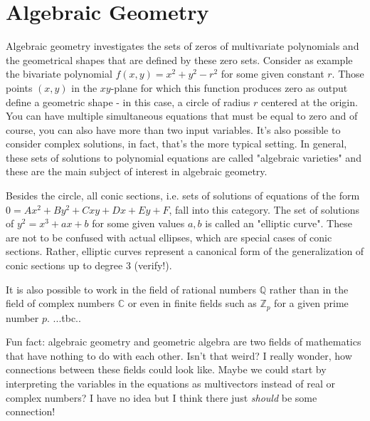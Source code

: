 \section{Algebraic Geometry}
Algebraic geometry investigates the sets of zeros of multivariate polynomials and the geometrical shapes that are defined by these zero sets. Consider as example the bivariate polynomial $f(x,y) = x^2 + y^2 - r^2$ for some given constant $r$. Those points $(x,y)$ in the $xy$-plane for which this function produces zero as output define a geometric shape - in this case, a circle of radius $r$ centered at the origin. You can have multiple simultaneous equations that must be equal to zero and of course, you can also have more than two input variables. It's also possible to consider complex solutions, in fact, that's the more typical setting. In general, these sets of solutions to polynomial equations are called "algebraic varieties" and these are the main subject of interest in algebraic geometry.

\medskip
Besides the circle, all conic sections, i.e. sets of solutions of equations of the form $0 = A x^2 + B y^2 + C x y + D x + E y + F$, fall into this category. The set of solutions of $y^2 = x^3 + a x + b$ for some given values $a,b$ is called an "elliptic curve". These are not to be confused with actual ellipses, which are special cases of conic sections. Rather, elliptic curves represent a canonical form of the generalization of conic sections up to degree 3 (verify!).




\medskip
It is also possible to work in the field of rational numbers $\mathbb{Q}$ rather than in the field of complex numbers $\mathbb{C}$ or even in finite fields such as $\mathbb{Z}_p$ for a given prime number $p$. ...tbc..

Fun fact: algebraic geometry and geometric algebra are two fields of mathematics that have nothing to do with each other. Isn't that weird? I really wonder, how connections between these fields could look like. Maybe we could start by interpreting the variables in the equations as multivectors instead of real or complex numbers? I have no idea but I think there just \emph{should} be some connection!


